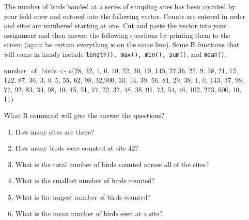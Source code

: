 
\begin{q}
  The number of birds banded at a series of sampling sites has been
  counted by your field crew and entered into the following
  vector. Counts are entered in order and sites are numbered starting
  at one. Cut and paste the vector into your assignment and then
  answer the following questions by printing them to the screen (again
  be certain everything is on the same line). Some
  R functions that will come in handy include \texttt{length(), max(), min(),
  sum()}, and \texttt{mean()}.

\begin{rcode}
number_of_birds <- c(28, 32, 1, 0, 10, 22, 30, 19, 145, 27,36, 25, 9, 38, 21, 12, 122, 87, 36, 3, 0, 5, 55, 62, 98, 32,900, 33, 14, 39, 56, 81, 29, 38, 1, 0, 143, 37, 98, 77, 92, 83, 34, 98, 40, 45, 51, 17, 22, 37, 48, 38, 91, 73, 54, 46, 102, 273, 600, 10, 11)
\end{rcode}

What R command will give the answer the questions?
  \begin{enumerate}
  \item How many sites are there?   
  \item How many birds were counted at site 42?   
  \item What is the total number of birds counted across all of the
    sites?   
  \item What is the smallest number of birds counted?   
  \item What is the largest number of birds counted?    
  \item What is the mean number of birds seen at a site?   
  \end{enumerate} 
\end{q} 



